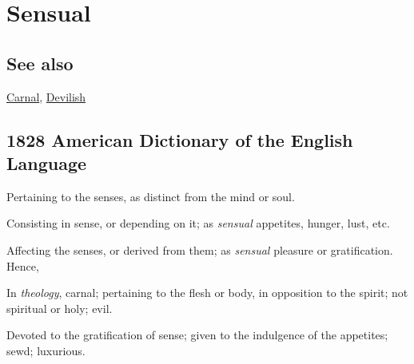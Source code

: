 \section{Sensual}
	\label{SENSUAL}
	
\subsection{See also}

	\hyperref[CARNAL]{Carnal}, \hyperref[DEVILISH]{Devilish}

\subsection{1828 American Dictionary of the English Language} %
	\label{SENSUAL-1828}

	\begin{compactitem}
		\item[1] Pertaining to the senses, as distinct from the mind or soul.
		\item[2] Consisting in sense, or depending on it; as \textit{sensual} appetites, hunger, lust, etc.
		\item[3] Affecting the senses, or derived from them; as \textit{sensual} pleasure or gratification. Hence,
		\item[4] In \textit{theology}, carnal; pertaining to the flesh or body, in opposition to the spirit; not spiritual or holy; evil.
		\item[5] Devoted to the gratification of sense; given to the indulgence of the appetites; sewd; luxurious.
	\end{compactitem}


	

